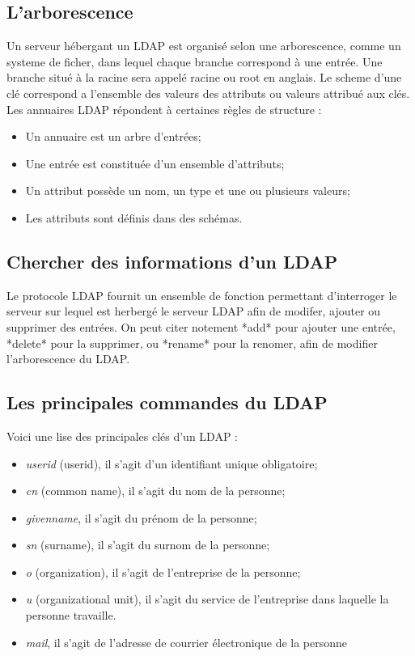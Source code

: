 \subsection{L'arborescence}

Un serveur hébergant un LDAP est organisé selon une arborescence, comme un systeme de ficher, dans lequel chaque branche correspond à une entrée. Une branche situé à la racine sera appelé racine ou root en anglais. Le scheme d'une clé correspond a l'ensemble des valeurs des attributs ou valeurs attribué aux clés.
Les annuaires LDAP répondent à certaines règles de structure :
\begin{itemize}
    \item Un annuaire est un arbre d'entrées;
    \item Une entrée est constituée d'un ensemble d'attributs;
    \item Un attribut possède un nom, un type et une ou plusieurs valeurs;
    \item Les attributs sont définis dans des schémas.
\end{itemize}


\subsection{Chercher des informations d'un LDAP}

Le protocole LDAP fournit un ensemble de fonction permettant d'interroger le serveur sur lequel est herbergé le serveur LDAP afin de modifer, ajouter ou supprimer des entrées. On peut citer notement *add* pour ajouter une entrée, *delete* pour la supprimer, ou *rename* pour la renomer, afin de modifier l'arborescence du LDAP.
\subsection{Les principales commandes du LDAP}
Voici une lise des principales clés d'un LDAP :
\begin{itemize}
    \item \textit{userid} (userid), il s'agit d'un identifiant unique obligatoire;
    \item \textit{cn} (common name), il s'agit du nom de la personne;
    \item \textit{givenname}, il s'agit du prénom de la personne;
    \item \textit{sn} (surname), il s'agit du surnom de la personne;
    \item \textit{o} (organization), il s'agit de l'entreprise de la personne;
    \item \textit{u} (organizational unit), il s'agit du service de l'entreprise dans laquelle la personne travaille.
    \item \textit{mail}, il s'agit de l'adresse de courrier électronique de la personne
\end{itemize}

